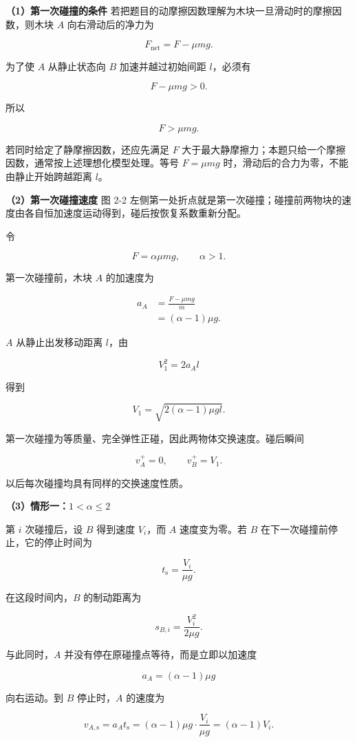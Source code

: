 \documentclass[12pt,a4paper,UTF8]{ctexart}
\begin{document}
\textbf{（1）第一次碰撞的条件}
若把题目的动摩擦因数理解为木块一旦滑动时的摩擦因数，则木块 \(A\)
向右滑动后的净力为

\[F_{\mathrm{net}}=F-\mu mg.\]

为了使 \(A\) 从静止状态向 \(B\) 加速并越过初始间距 \(l\)，必须有

\[F-\mu mg>0.\]

所以

\[\boxed{F>\mu mg}.\]

若同时给定了静摩擦因数，还应先满足 \(F\)
大于最大静摩擦力；本题只给一个摩擦因数，通常按上述理想化模型处理。等号
\(F=\mu mg\) 时，滑动后的合力为零，不能由静止开始跨越距离 \(l\)。

\textbf{（2）第一次碰撞速度} 图 2-2
左侧第一处折点就是第一次碰撞；碰撞前两物块的速度由各自恒加速度运动得到，碰后按恢复系数重新分配。

令

\[F=\alpha\mu mg,\qquad \alpha>1.\]

第一次碰撞前，木块 \(A\) 的加速度为

\[\begin{aligned}
a_A
&=\frac{F-\mu mg}{m}\\
&=(\alpha-1)\mu g.
\end{aligned}\]

\(A\) 从静止出发移动距离 \(l\)，由

\[V_1^2=2a_Al\]

得到

\[\boxed{V_1=\sqrt{2(\alpha-1)\mu gl}}.\]

第一次碰撞为等质量、完全弹性正碰，因此两物体交换速度。碰后瞬间

\[v_A^+=0,\qquad v_B^+=V_1.\]

以后每次碰撞均具有同样的交换速度性质。

\textbf{（3）情形一：\(1<\alpha\leq2\)}

第 \(i\) 次碰撞后，设 \(B\) 得到速度 \(V_i\)，而 \(A\) 速度变为零。若
\(B\) 在下一次碰撞前停止，它的停止时间为

\[t_{\mathrm s}=\frac{V_i}{\mu g}.\]

在这段时间内，\(B\) 的制动距离为

\[s_{B,i}=\frac{V_i^2}{2\mu g}.\]

与此同时，\(A\) 并没有停在原碰撞点等待，而是立即以加速度

\[a_A=(\alpha-1)\mu g\]

向右运动。到 \(B\) 停止时，\(A\) 的速度为

\[v_{A,\mathrm s}
=a_At_{\mathrm s}
=(\alpha-1)\mu g\cdot\frac{V_i}{\mu g}
=(\alpha-1)V_i.\]
\end{document}
